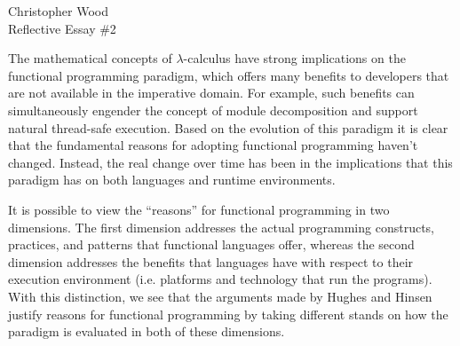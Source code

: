 \documentclass[12pt,letterpaper]{article}
\begin{document}
\begin{center}
Christopher Wood \\
Reflective Essay \#2 \\
\end{center}




The mathematical concepts of $\lambda$-calculus have strong implications on the functional programming paradigm, which offers many benefits to developers that are not available in the imperative domain. For example, such benefits can simultaneously engender the concept of module decomposition and support natural thread-safe execution. Based on the evolution of this paradigm it is clear that the fundamental reasons for adopting functional programming haven't changed. Instead, the real change over time has been in the implications that this paradigm has on both languages and runtime environments. 

It is possible to view the ``reasons'' for functional programming in two dimensions. The first dimension addresses 
the actual programming constructs, practices, and patterns that functional languages offer, whereas the second dimension addresses the benefits that languages have with respect to their execution environment (i.e. platforms and technology that
run the programs). With this distinction, we see that the arguments made by Hughes \cite{Hughes} and Hinsen \cite{Hinsen} justify reasons for functional programming by taking different stands on how the paradigm is evaluated in both of these dimensions.
\end{document}
